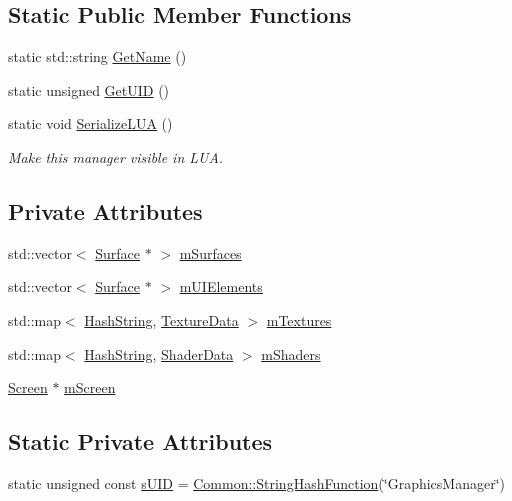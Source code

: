 \subsection*{Static Public Member Functions}
\begin{DoxyCompactItemize}
\item 
static std\+::string \hyperlink{classGraphicsManager_abe493f4e4858fe83b7a9210e827a63e1}{Get\+Name} ()
\item 
static unsigned \hyperlink{classGraphicsManager_ac7ac11190aa116df6d9887a794797d94}{Get\+U\+ID} ()
\item 
static void \hyperlink{classGraphicsManager_acc00f7182a8f93b5c2bbb1b89c0b39b6}{Serialize\+L\+UA} ()
\begin{DoxyCompactList}\small\item\em Make this manager visible in L\+UA. \end{DoxyCompactList}\end{DoxyCompactItemize}
\subsection*{Private Attributes}
\begin{DoxyCompactItemize}
\item 
std\+::vector$<$ \hyperlink{classSurface}{Surface} $\ast$ $>$ \hyperlink{classGraphicsManager_aa30248870f228fce54015450fd3f7726}{m\+Surfaces}
\item 
std\+::vector$<$ \hyperlink{classSurface}{Surface} $\ast$ $>$ \hyperlink{classGraphicsManager_ae08417bb43d000e45aa8b97b25158296}{m\+U\+I\+Elements}
\item 
std\+::map$<$ \hyperlink{classHashString}{Hash\+String}, \hyperlink{structTextureData}{Texture\+Data} $>$ \hyperlink{classGraphicsManager_aaa8c0e8cd3178da0462a69f78cc39ed1}{m\+Textures}
\item 
std\+::map$<$ \hyperlink{classHashString}{Hash\+String}, \hyperlink{structShaderData}{Shader\+Data} $>$ \hyperlink{classGraphicsManager_a36809d815578ce17cb660ac9bbed3e2f}{m\+Shaders}
\item 
\hyperlink{classScreen}{Screen} $\ast$ \hyperlink{classGraphicsManager_ae86dac7e0d920ed3e4edc1247eb88ec4}{m\+Screen}
\end{DoxyCompactItemize}
\subsection*{Static Private Attributes}
\begin{DoxyCompactItemize}
\item 
static unsigned const \hyperlink{classGraphicsManager_a63a569e94f0de22eebd69e5704f7aa3d}{s\+U\+ID} = \hyperlink{namespaceCommon_a994c43a8ea7b03968186a635687a6521}{Common\+::\+String\+Hash\+Function}(\char`\"{}Graphics\+Manager\char`\"{})
\end{DoxyCompactItemize}
